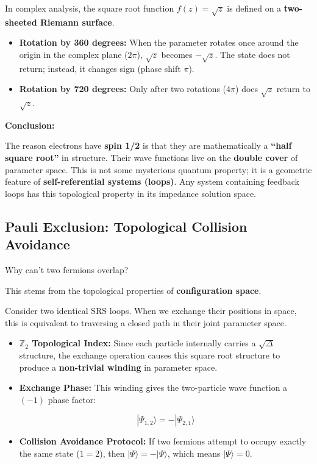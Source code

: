 \documentclass[11pt,a4paper,twoside]{book}
\begin{document}
In complex analysis, the square root function $f(z) = \sqrt{z}$ is defined on a \textbf{two-sheeted Riemann surface}.

\begin{itemize}
\item \textbf{Rotation by 360 degrees:} When the parameter rotates once around the origin in the complex plane ($2\pi$), $\sqrt{z}$ becomes $-\sqrt{z}$. The state does not return; instead, it changes sign (phase shift $\pi$).

\item \textbf{Rotation by 720 degrees:} Only after two rotations ($4\pi$) does $\sqrt{z}$ return to $\sqrt{z}$.
\end{itemize}

\textbf{Conclusion:}

The reason electrons have \textbf{spin 1/2} is that they are mathematically a \textbf{``half square root''} in structure. Their wave functions live on the \textbf{double cover} of parameter space. This is not some mysterious quantum property; it is a geometric feature of \textbf{self-referential systems (loops)}. Any system containing feedback loops has this topological property in its impedance solution space.

\subsection{Pauli Exclusion: Topological Collision Avoidance}

Why can't two fermions overlap?

This stems from the topological properties of \textbf{configuration space}.

Consider two identical SRS loops. When we exchange their positions in space, this is equivalent to traversing a closed path in their joint parameter space.

\begin{itemize}
\item \textbf{$\mathbb{Z}_2$ Topological Index:} Since each particle internally carries a $\sqrt{\Delta}$ structure, the exchange operation causes this square root structure to produce a \textbf{non-trivial winding} in parameter space.

\item \textbf{Exchange Phase:} This winding gives the two-particle wave function a \textbf{$(-1)$} phase factor:

    $$|\Psi_{1,2}\rangle = - |\Psi_{2,1}\rangle$$

\item \textbf{Collision Avoidance Protocol:} If two fermions attempt to occupy exactly the same state ($1=2$), then $|\Psi\rangle = -|\Psi\rangle$, which means $|\Psi\rangle = 0$.
\end{itemize}
\end{document}
